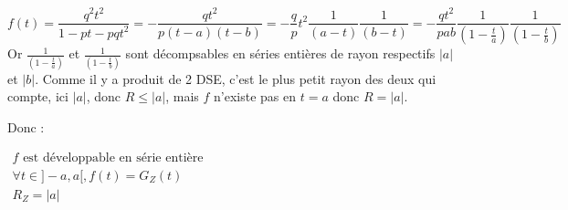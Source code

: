 \[
  f(t) = \frac{q^2t^2}{1-pt-pqt^2} = -\frac{qt^2}{p(t-a)(t-b)} = -\frac{q}{p}t^2\frac{1}{(a-t)}\frac{1}{(b-t)} = -\frac{qt^2}{pab}\frac{1}{(1-\frac{t}{a})}\frac{1}{(1-\frac{t}{b})}
\]
Or $\frac{1}{(1-\frac{t}{a})}$ et $\frac{1}{(1-\frac{t}{b})}$ sont décompsables en séries entières de rayon respectifs $|a|$ et $|b|$.
Comme il y a produit de 2 DSE, c'est le plus petit rayon des deux qui compte, ici $|a|$, donc $R\leq|a|$, mais $f$ n'existe pas en $t=a$ donc $R=|a|$.

Donc :
\begin{result}
  $
    \begin{array}{l}
      f \text{ est développable en série entière} \\
      \forall t \in ]-a, a[, f(t) = G_Z(t)        \\
      R_Z = |a|                                   \\
    \end{array}
  $
\end{result}

